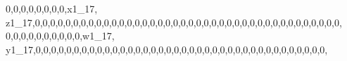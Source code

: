 \documentclass[]{article}
\newenvironment{Shaded}{\begin{snugshade}}{\end{snugshade}}
\newcommand{\DecValTok}[1]{\textcolor[rgb]{0.00,0.00,0.81}{#1}}
\newcommand{\NormalTok}[1]{#1}
\begin{document}
\begin{Shaded}
\begin{Highlighting}[]
\DecValTok{0}\NormalTok{,}\DecValTok{0}\NormalTok{,}\DecValTok{0}\NormalTok{,}\DecValTok{0}\NormalTok{,}\DecValTok{0}\NormalTok{,}\DecValTok{0}\NormalTok{,}\DecValTok{0}\NormalTok{,}\DecValTok{0}\NormalTok{,x1_}\DecValTok{17}\NormalTok{, z1_}\DecValTok{17}\NormalTok{,}\DecValTok{0}\NormalTok{,}\DecValTok{0}\NormalTok{,}\DecValTok{0}\NormalTok{,}\DecValTok{0}\NormalTok{,}\DecValTok{0}\NormalTok{,}\DecValTok{0}\NormalTok{,}\DecValTok{0}\NormalTok{,}\DecValTok{0}\NormalTok{,}\DecValTok{0}\NormalTok{,}\DecValTok{0}\NormalTok{,}\DecValTok{0}\NormalTok{,}\DecValTok{0}\NormalTok{,}\DecValTok{0}\NormalTok{,}\DecValTok{0}\NormalTok{,}\DecValTok{0}\NormalTok{,}\DecValTok{0}\NormalTok{,}\DecValTok{0}\NormalTok{,}\DecValTok{0}\NormalTok{,}\DecValTok{0}\NormalTok{,}\DecValTok{0}\NormalTok{,}\DecValTok{0}\NormalTok{,}\DecValTok{0}\NormalTok{,}\DecValTok{0}\NormalTok{,}\DecValTok{0}\NormalTok{,}\DecValTok{0}\NormalTok{,}\DecValTok{0}\NormalTok{,}\DecValTok{0}\NormalTok{,}\DecValTok{0}\NormalTok{,}\DecValTok{0}\NormalTok{,}\DecValTok{0}\NormalTok{,}\DecValTok{0}\NormalTok{,}\DecValTok{0}\NormalTok{,}\DecValTok{0}\NormalTok{,}\DecValTok{0}\NormalTok{,}\DecValTok{0}\NormalTok{,}\DecValTok{0}\NormalTok{,}\DecValTok{0}\NormalTok{,}\DecValTok{0}\NormalTok{,}\DecValTok{0}\NormalTok{,}\DecValTok{0}\NormalTok{,}
\DecValTok{0}\NormalTok{,}\DecValTok{0}\NormalTok{,}\DecValTok{0}\NormalTok{,}\DecValTok{0}\NormalTok{,}\DecValTok{0}\NormalTok{,}\DecValTok{0}\NormalTok{,}\DecValTok{0}\NormalTok{,}\DecValTok{0}\NormalTok{,}\DecValTok{0}\NormalTok{,}\DecValTok{0}\NormalTok{,w1_}\DecValTok{17}\NormalTok{, y1_}\DecValTok{17}\NormalTok{,}\DecValTok{0}\NormalTok{,}\DecValTok{0}\NormalTok{,}\DecValTok{0}\NormalTok{,}\DecValTok{0}\NormalTok{,}\DecValTok{0}\NormalTok{,}\DecValTok{0}\NormalTok{,}\DecValTok{0}\NormalTok{,}\DecValTok{0}\NormalTok{,}\DecValTok{0}\NormalTok{,}\DecValTok{0}\NormalTok{,}\DecValTok{0}\NormalTok{,}\DecValTok{0}\NormalTok{,}\DecValTok{0}\NormalTok{,}\DecValTok{0}\NormalTok{,}\DecValTok{0}\NormalTok{,}\DecValTok{0}\NormalTok{,}\DecValTok{0}\NormalTok{,}\DecValTok{0}\NormalTok{,}\DecValTok{0}\NormalTok{,}\DecValTok{0}\NormalTok{,}\DecValTok{0}\NormalTok{,}\DecValTok{0}\NormalTok{,}\DecValTok{0}\NormalTok{,}\DecValTok{0}\NormalTok{,}\DecValTok{0}\NormalTok{,}\DecValTok{0}\NormalTok{,}\DecValTok{0}\NormalTok{,}\DecValTok{0}\NormalTok{,}\DecValTok{0}\NormalTok{,}\DecValTok{0}\NormalTok{,}\DecValTok{0}\NormalTok{,}\DecValTok{0}\NormalTok{,}\DecValTok{0}\NormalTok{,}\DecValTok{0}\NormalTok{,}\DecValTok{0}\NormalTok{,}\DecValTok{0}\NormalTok{,}\DecValTok{0}\NormalTok{,}\DecValTok{0}\NormalTok{,}

\end{Highlighting}
\end{Shaded}
\end{document}
